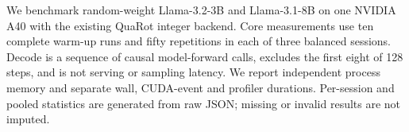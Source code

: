 We benchmark random-weight Llama-3.2-3B and Llama-3.1-8B on one NVIDIA A40 with the existing QuaRot integer backend. Core measurements use ten complete warm-up runs and fifty repetitions in each of three balanced sessions. Decode is a sequence of causal model-forward calls, excludes the first eight of 128 steps, and is not serving or sampling latency. We report independent process memory and separate wall, CUDA-event and profiler durations. Per-session and pooled statistics are generated from raw JSON; missing or invalid results are not imputed.
